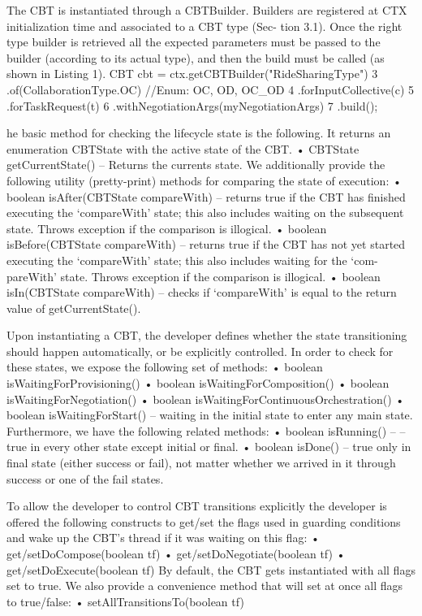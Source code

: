 The CBT is instantiated through a CBTBuilder. Builders are registered at CTX initialization time and associated to a CBT type (Sec- tion 3.1). Once the right type builder is retrieved all the expected parameters must be passed to the builder (according to its actual type), and then the build must be called (as shown in Listing 1).
CBT cbt = ctx.getCBTBuilder("RideSharingType")
3 .of(CollaborationType.OC) //Enum: OC, OD, OC_OD
4 .forInputCollective(c)
5 .forTaskRequest(t)
6 .withNegotiationArgs(myNegotiationArgs)
7 .build();

he basic method for checking the lifecycle state is the following. It returns an enumeration CBTState with the active state of the CBT.
• CBTState getCurrentState() – Returns the currents state.
We additionally provide the following utility (pretty-print) methods for comparing the state of execution:
• boolean isAfter(CBTState compareWith) – returns true if the CBT has finished executing the ‘compareWith’ state; this also includes waiting on the subsequent state. Throws exception if the comparison is illogical.
• boolean isBefore(CBTState compareWith) – returns true if the CBT has not yet started executing the ‘compareWith’ state; this also includes waiting for the ‘com- pareWith’ state. Throws exception if the comparison is illogical.
• boolean isIn(CBTState compareWith) – checks if ‘compareWith’ is equal to the return value of getCurrentState().

Upon instantiating a CBT, the developer defines whether the state transitioning should happen automatically, or be explicitly controlled. In order to check for these states, we expose the following set of methods:
• boolean isWaitingForProvisioning()
• boolean isWaitingForComposition()
• boolean isWaitingForNegotiation()
• boolean isWaitingForContinuousOrchestration()
• boolean isWaitingForStart() – waiting in the initial state to enter any main
state.
Furthermore, we have the following related methods:
• boolean isRunning() – – true in every other state except initial or final.
• boolean isDone() – true only in final state (either success or fail), not matter
whether we arrived in it through success or one of the fail states.

To allow the developer to control CBT transitions explicitly the developer is offered the following constructs to get/set the flags used in guarding conditions and wake up the CBT’s thread if it was waiting on this flag:
• get/setDoCompose(boolean tf)
• get/setDoNegotiate(boolean tf) • get/setDoExecute(boolean tf)
By default, the CBT gets instantiated with all flags set to true. We also provide a convenience method that will set at once all flags to true/false:
• setAllTransitionsTo(boolean tf)


